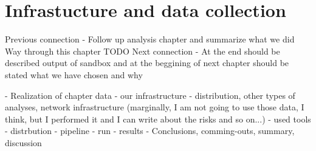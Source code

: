 \chapter{Infrastucture and data collection}



Previous connection
- Follow up analysis chapter and summarize what we did
Way through this chapter
TODO
Next connection
- At the end should be described output of sandbox and at the beggining of next chapter should be stated what we have chosen and why



- Realization of chapter data 
- our infrastructure - distribution, other types of analyses, network infrastructure (marginally, I am not going to use those data, I think, but I performed it and I can write about the risks and so on...)
- used tools
- distrbution
- pipeline
- run
- results
- Conclusions, comming-outs, summary, discussion